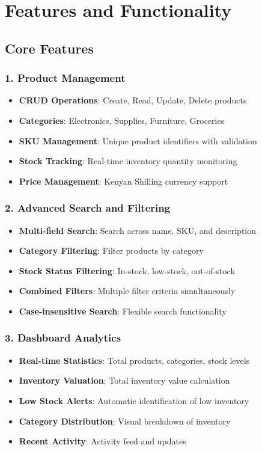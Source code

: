 \documentclass[12pt,a4paper]{article}
\begin{document}
\section{Features and Functionality}

\subsection{Core Features}

\subsubsection{1. Product Management}
\begin{itemize}
    \item \textbf{CRUD Operations}: Create, Read, Update, Delete products
    \item \textbf{Categories}: Electronics, Supplies, Furniture, Groceries
    \item \textbf{SKU Management}: Unique product identifiers with validation
    \item \textbf{Stock Tracking}: Real-time inventory quantity monitoring
    \item \textbf{Price Management}: Kenyan Shilling currency support
\end{itemize}

\subsubsection{2. Advanced Search and Filtering}
\begin{itemize}
    \item \textbf{Multi-field Search}: Search across name, SKU, and description
    \item \textbf{Category Filtering}: Filter products by category
    \item \textbf{Stock Status Filtering}: In-stock, low-stock, out-of-stock
    \item \textbf{Combined Filters}: Multiple filter criteria simultaneously
    \item \textbf{Case-insensitive Search}: Flexible search functionality
\end{itemize}

\subsubsection{3. Dashboard Analytics}
\begin{itemize}
    \item \textbf{Real-time Statistics}: Total products, categories, stock levels
    \item \textbf{Inventory Valuation}: Total inventory value calculation
    \item \textbf{Low Stock Alerts}: Automatic identification of low inventory
    \item \textbf{Category Distribution}: Visual breakdown of inventory
    \item \textbf{Recent Activity}: Activity feed and updates
\end{itemize}
\end{document}
